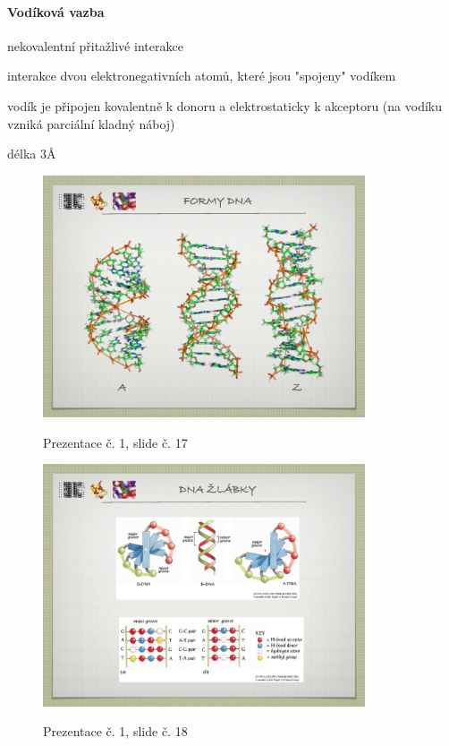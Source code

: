 \documentclass[DIV=8]{scrreprt}
\begin{document}
\paragraph{Vodíková vazba}
\begin{myItemize}[nosep]
    \item nekovalentní přitažlivé interakce
    \item interakce dvou elektronegativních atomů, které jsou "spojeny" vodíkem
    \item vodík je připojen kovalentně k donoru a elektrostaticky k akceptoru (na vodíku vzniká parciální kladný náboj)
    \item délka 3Å
\end{myItemize}



\begin{figure}
    \caption{Prezentace č. 1, slide č. 17}
    \includegraphics[width=0.85\textwidth]{slides-1/slide-17.jpg}
    \centering
    \label{slides-1-slide-17}
\end{figure}
\begin{figure}
    \caption{Prezentace č. 1, slide č. 18}
    \includegraphics[width=0.85\textwidth]{slides-1/slide-18.jpg}
    \centering
    \label{slides-1-slide-18}
\end{figure}
\end{document}
